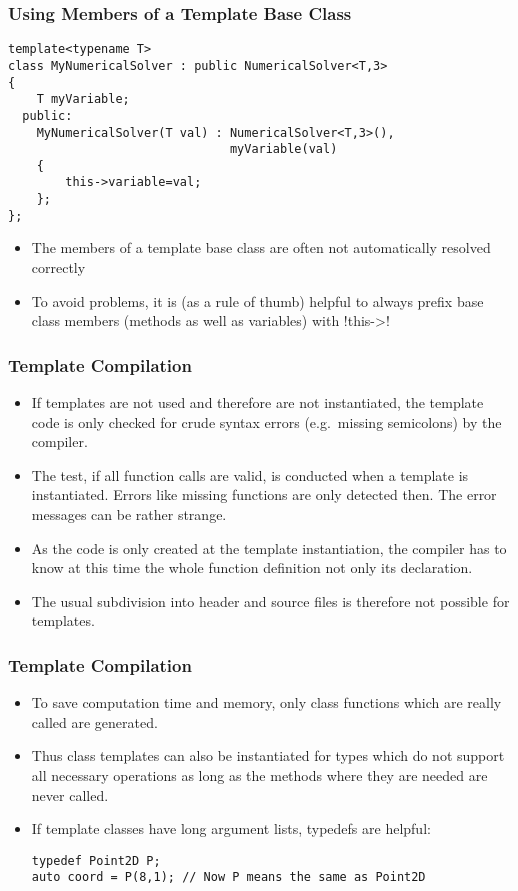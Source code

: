 \begin{frame}[fragile]
\frametitle{Using Members of a Template Base Class}
\begin{lstlisting}
template<typename T>
class MyNumericalSolver : public NumericalSolver<T,3>
{
    T myVariable;
  public:
    MyNumericalSolver(T val) : NumericalSolver<T,3>(),
                               myVariable(val)
    {
        this->variable=val;
    };
};
\end{lstlisting}
\begin{itemize}
\item The members of a template base class are often not automatically resolved correctly
\item To avoid problems, it is (as a rule of thumb) helpful to always prefix
base class members (methods as well as variables) with \inline!this->!
\end{itemize}

\end{frame}



\begin{frame}[fragile]
\frametitle{Template Compilation}
\begin{itemize}
\item If templates are not used and therefore are not instantiated, the template code is only
checked for crude syntax errors (e.g.~missing semicolons) by the compiler.
\item The test, if all function calls are valid, is conducted when a template is instantiated.
Errors like missing functions are only detected then. The error messages can be rather strange.
\item As the code is only created at the template instantiation, the compiler has to know at this
time the whole function definition not only its declaration.
\item The usual subdivision into header and source files is therefore not possible for templates.
\end{itemize}
\end{frame}


\begin{frame}[fragile]
\frametitle<presentation>{Template Compilation}
\begin{itemize}
\item To save computation time and memory, only class functions which are really called are generated.
\item Thus
class templates can also be instantiated for types which do not support all necessary operations as long
as the methods where they are needed are never called.
\item If template classes have long argument lists, typedefs are helpful:
\begin{lstlisting}
typedef Point2D P;
auto coord = P(8,1); // Now P means the same as Point2D
\end{lstlisting}

\end{itemize}
\end{frame}

